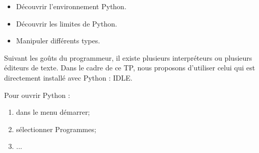 \documentclass[10pt]{article}
\newif\ifxp
\begin{document}
\ifxp

\else

\fi



 \renewcommand{\baselinestretch}{1.2}
\setlength{\parskip}{2ex plus 0.5ex minus 0.2ex}


\begin{obj}
\begin{itemize}
\item Découvrir l'environnement Python.
\item Découvrir les limites de Python.
\item Manipuler différents types.
\end{itemize}
\end{obj}
 



\begin{rem}
Suivant les goûts du programmeur, il existe plusieurs interpréteurs ou plusieurs éditeurs de texte. Dans le cadre de ce TP, nous proposons d'utiliser celui qui est directement installé avec Python : IDLE.
\end{rem}

Pour ouvrir Python :
\begin{enumerate}
\item dans le menu démarrer;
\item sélectionner Programmes;
\item ...
\end{enumerate}

\vspace{.5cm}
\end{document}
